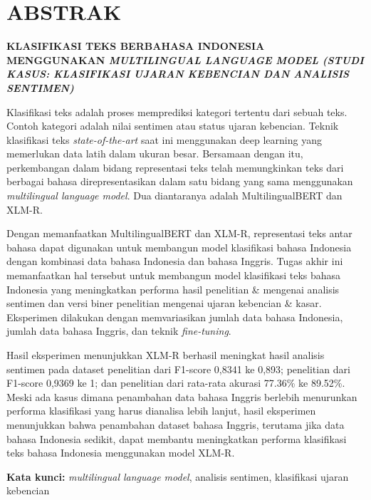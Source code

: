 \clearpage
\chapter*{ABSTRAK}
\begin{center} 
    \large \bfseries \MakeUppercase{Klasifikasi Teks Berbahasa Indonesia Menggunakan \textit{Multilingual Language Model (Studi Kasus: Klasifikasi Ujaran Kebencian dan Analisis Sentimen)}} 

    \normalsize {}
\end{center}


Klasifikasi teks adalah proses memprediksi kategori tertentu dari sebuah teks. Contoh kategori adalah nilai sentimen atau status ujaran kebencian. Teknik klasifikasi teks \textit{state-of-the-art} saat ini menggunakan deep learning yang memerlukan data latih dalam ukuran besar. Bersamaan dengan itu, perkembangan dalam bidang representasi teks telah memungkinkan teks dari berbagai bahasa direpresentasikan dalam satu bidang yang sama menggunakan \textit{multilingual language model}. Dua diantaranya adalah MultilingualBERT \parencite{Devlin_Chang_Lee_Toutanova_2019} dan XLM-R\parencite{Conneau_XLMR}.

Dengan memanfaatkan MultilingualBERT dan XLM-R, representasi teks antar bahasa dapat digunakan untuk membangun model klasifikasi bahasa Indonesia dengan kombinasi data bahasa Indonesia dan bahasa Inggris. Tugas akhir ini memanfaatkan hal tersebut untuk membangun model klasifikasi teks bahasa Indonesia yang meningkatkan performa hasil penelitian \parencite{FarhanKhodra2017} \& \parencite{CrisdayantiPurwarianti2019} mengenai analisis sentimen dan versi biner penelitian \parencite{Ibrohim_Budi_2019} mengenai ujaran kebencian \& kasar. Eksperimen dilakukan dengan memvariasikan jumlah data bahasa Indonesia, jumlah data bahasa Inggris, dan teknik \textit{fine-tuning}.

Hasil eksperimen menunjukkan XLM-R berhasil meningkat hasil analisis sentimen pada dataset penelitian \parencite{FarhanKhodra2017} dari F1-score 0,8341 ke 0,893; penelitian \parencite{CrisdayantiPurwarianti2019} dari F1-score 0,9369 ke 1; dan penelitian \parencite{Ibrohim_Budi_2019} dari rata-rata akurasi 77.36\% ke 89.52\%. Meski ada kasus dimana penambahan data bahasa Inggris berlebih menurunkan performa klasifikasi yang harus dianalisa lebih lanjut, hasil eksperimen menunjukkan bahwa penambahan dataset bahasa Inggris, terutama jika data bahasa Indonesia sedikit, dapat membantu meningkatkan performa klasifikasi teks bahasa Indonesia menggunakan model XLM-R.

\textbf{Kata kunci:} \textit{multilingual language model}, analisis sentimen, klasifikasi ujaran kebencian
\clearpage
